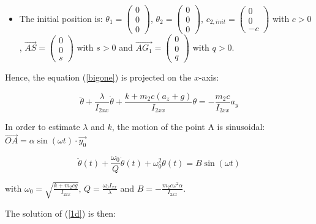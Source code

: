 \documentclass[a4paper, 11pt]{article}
\begin{document}
\begin{itemize}
 \item The initial position is: $\theta_1 =
       \begin{pmatrix}
        0 \\
        0 \\
        0
       \end{pmatrix}$, $\theta_2 =
       \begin{pmatrix}
        0 \\
        0 \\
        0
       \end{pmatrix}$, $c_{2, init} =
       \begin{pmatrix}
        0 \\
        0 \\
        -c
       \end{pmatrix}$ with $c > 0$, $\overrightarrow{AS} =
       \begin{pmatrix}
        0  \\
        0  \\
        s
       \end{pmatrix}$ with $s > 0$ and $\overrightarrow{AG_1} =
       \begin{pmatrix}
        0  \\
        0  \\
        q
       \end{pmatrix}$ with $q > 0$.

\end{itemize}

Hence, the equation (\ref{bigone}) is projected on the $x$-axis:

\begin{equation*}
 \ddot{\theta} + \frac{\lambda}{I_{2xx}} \dot{\theta} + \frac{k + m_2 c (a_z + g)}{I_{2xx}} \theta = - \frac{m_2 c}{I_{2xx}} a_y
\end{equation*}

In order to estimate $\lambda$ and $k$, the motion of the point A is sinusoidal: $\overrightarrow{OA} = \alpha \sin(\omega t) \cdot \overrightarrow{y_0}$

\begin{equation}
 \label{1d}
 \ddot{\theta}(t) + \frac{\omega_0}{Q} \dot{\theta}(t) + \omega_0^2 \theta(t) = B \sin(\omega t)
\end{equation}

with $\omega_0 = \sqrt{\frac{k + m_2 c g}{I_{2xx}}}$, $Q = \frac{\omega_0 I_{xx}}{\lambda}$ and $B = -\frac{m_2 c \omega^2 \alpha}{I_{2xx}}$.

The solution of (\ref{1d}) is then:
\end{document}
